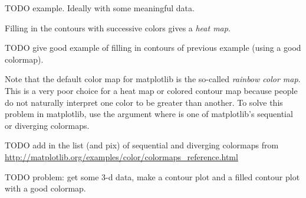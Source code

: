 TODO example.  Ideally with some meaningful data. 


Filling in the contours with successive colors gives a  \emph{heat map}.  

TODO give good example of filling in contours of previous example (using a good colormap).


Note that the default color map for matplotlib is the so-called \emph{rainbow color map}.  This is a very poor choice for a heat map or colored contour map because people do not naturally interpret one color to be greater than another.  To solve this problem in matplotlib, use the argument 
where  is one of matplotlib's sequential or diverging colormaps. 

TODO add in the list (and pix) of sequential and diverging colormaps from \url{http://matplotlib.org/examples/color/colormaps_reference.html} 




\begin{problem}
TODO problem: get some 3-d data, make a contour plot and a filled contour plot with a good colormap.
\end{problem}


